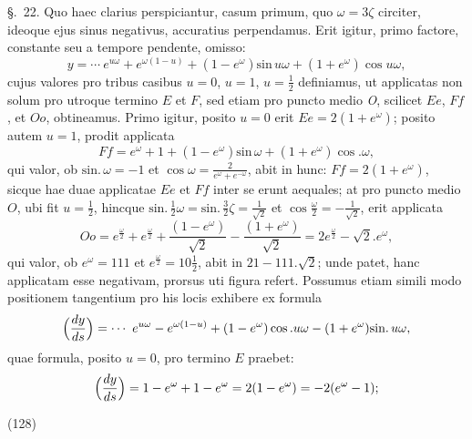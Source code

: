 \documentclass[11pt,a4paper]{article}
\begin{document}
§.~22. Quo haec clarius perspiciantur, casum primum, quo $\omega = 3\zeta$ circiter,
ideoque ejus sinus negativus, accuratius perpendamus. Erit igitur, primo factore,
constante seu a tempore pendente, omisso:
\[
y = \cdots\ e^{u\omega} + e^{\omega(1-u)} + (1 - e^\omega)\text{sin}\,u\omega + (1 + e^\omega)\cos u\omega,
\]
cujus valores pro tribus casibus $u = 0$, $u = 1$, $u = \frac{1}{2}$ definiamus, ut
applicatas non solum pro utroque termino $E$ et $F$, sed etiam pro puncto medio
\emph{O}, scilicet $Ee$, $Ff$, et $Oo$, obtineamus. Primo igitur, posito $u = 0$ erit
$Ee = 2(1 + e^\omega)$; posito autem $u = 1$, prodit applicata
\[
Ff = e^\omega + 1 + (1 - e^\omega)\text{sin}\,\omega + (1 + e^\omega)\cos.\omega,
\]
qui valor, ob $\text{sin.}\,\omega = -1$ et $\cos\omega = \frac{2}{e^\omega + e^{-\omega}}$,
abit in hunc: $Ff = 2(1 + e^\omega)$, sicque hae duae applicatae $Ee$ et $Ff$ inter se
erunt aequales; at pro puncto medio $O$, ubi fit $u = \frac{1}{2}$, hincque
$\text{sin.}\,\frac{1}{2}\omega = \text{sin.}\,\frac{3}{2}\zeta = \frac{1}{\sqrt{2}}$ et
$\cos\frac{\omega}{2} = -\frac{1}{\sqrt{2}}$, erit applicata
\[
Oo = e^{\frac{\omega}{2}} + e^{\frac{\omega}{2}} + \frac{(1 - e^\omega)}{\sqrt{2}} - \frac{(1 + e^\omega)}{\sqrt{2}} = 2e^{\frac{\omega}{2}} - \sqrt{2}.e^\omega,
\]
qui valor, ob $e^\omega = 111$ et $e^{\frac{\omega}{2}} = 10\frac{1}{2}$, abit in
$21 - 111.\sqrt{2}$; unde patet, hanc applicatam esse negativam, prorsus uti figura
refert. Possumus etiam simili modo positionem tangentium pro his locis exhibere ex
formula
\[
\Bigl(\frac{dy}{ds}\Bigr) = \cdots\ e^{u\omega} - e^{\omega(1-u)} + (1 - e^\omega)\cos.u\omega - (1 + e^\omega)\text{sin.}\,u\omega,
\]
quae formula, posito $u = 0$, pro termino $E$ praebet:
\[
\Bigl(\frac{dy}{ds}\Bigr) = 1 - e^\omega + 1 - e^\omega = 2(1 - e^\omega) = -2(e^\omega - 1);
\]

(128)
\end{document}

